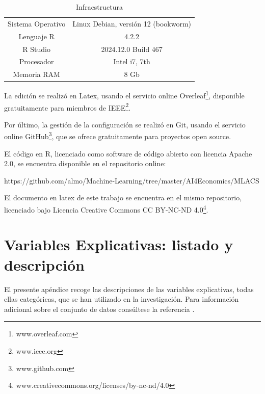 \documentclass[a4paper, 11pt]{article}
\begin{document}
\begin{table}[ht]
    \centering
    \begin{tabular}{c | c}
       Sistema Operativo  & Linux Debian, versión 12 (bookworm) \\
       Lenguaje R & 4.2.2 \\
       R Studio & 2024.12.0 Build 467 \\
       Procesador  &  Intel i7, 7th \\
       Memoria RAM & 8 Gb\\
    \end{tabular}
    \caption{Infraestructura}
    \label{tab:my_label}
\end{table}
La edición se realizó en Latex, usando el servicio online 
Overleaf\footnote{www.overleaf.com}, disponible gratuitamente para miembros de
IEEE\footnote{www.ieee.org}. 

Por último, la gestión de la configuración se realizó en Git, usando el
servicio online GitHub\footnote{www.github.com}, que se ofrece gratuitamente
para proyectos open source. 

El código en R, licenciado como software de código abierto con licencia Apache
2.0, se encuentra disponible en el repositorio online:
\begin{center}
\footnotesize
    https://github.com/almo/Machine-Learning/tree/master/AI4Economics/MLACS
\end{center}

El documento en latex de este trabajo se encuentra en el mismo repositorio, 
licenciado bajo Licencia Creative Commons CC BY-NC-ND 4.0\footnote{www.creativecommons.org/licenses/by-nc-nd/4.0}.  


\clearpage
\section{Variables Explicativas: listado y descripción}
\label{sec:features_description}
El presente apéndice recoge las descripciones de las variables explicativas, todas ellas categóricas, 
que se han utilizado en la investigación. Para información adicional sobre el conjunto de datos 
consúltese la referencia \cite{NFCS01}.
\end{document}

